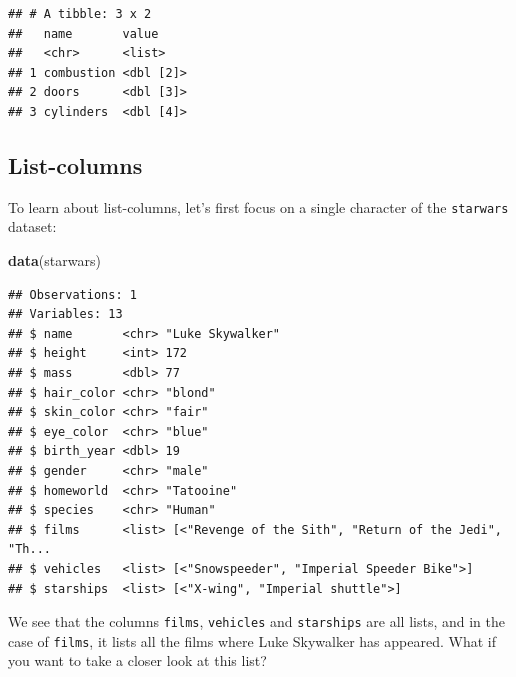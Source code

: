 \documentclass[]{gitbook}
\newenvironment{Shaded}{\begin{snugshade}}{\end{snugshade}}
\newcommand{\KeywordTok}[1]{\textcolor[rgb]{0.13,0.29,0.53}{\textbf{#1}}}
\newcommand{\NormalTok}[1]{#1}
\newcommand{\OperatorTok}[1]{\textcolor[rgb]{0.81,0.36,0.00}{\textbf{#1}}}
\newcommand{\StringTok}[1]{\textcolor[rgb]{0.31,0.60,0.02}{#1}}
\begin{document}
\begin{verbatim}
## # A tibble: 3 x 2
##   name       value    
##   <chr>      <list>   
## 1 combustion <dbl [2]>
## 2 doors      <dbl [3]>
## 3 cylinders  <dbl [4]>
\end{verbatim}

\hypertarget{list-columns}{%
\subsection{List-columns}\label{list-columns}}

To learn about list-columns, let's first focus on a single character of the \texttt{starwars} dataset:

\begin{Shaded}
\begin{Highlighting}[]
\KeywordTok{data}\NormalTok{(starwars)}
\end{Highlighting}
\end{Shaded}

\begin{Shaded}
\end{Shaded}

\begin{verbatim}
## Observations: 1
## Variables: 13
## $ name       <chr> "Luke Skywalker"
## $ height     <int> 172
## $ mass       <dbl> 77
## $ hair_color <chr> "blond"
## $ skin_color <chr> "fair"
## $ eye_color  <chr> "blue"
## $ birth_year <dbl> 19
## $ gender     <chr> "male"
## $ homeworld  <chr> "Tatooine"
## $ species    <chr> "Human"
## $ films      <list> [<"Revenge of the Sith", "Return of the Jedi", "Th...
## $ vehicles   <list> [<"Snowspeeder", "Imperial Speeder Bike">]
## $ starships  <list> [<"X-wing", "Imperial shuttle">]
\end{verbatim}

We see that the columns \texttt{films}, \texttt{vehicles} and \texttt{starships} are all lists, and in the case of
\texttt{films}, it lists all the films where Luke Skywalker has appeared. What if you want to take a closer look at this list?

\begin{Shaded}
\end{Shaded}
\end{document}
